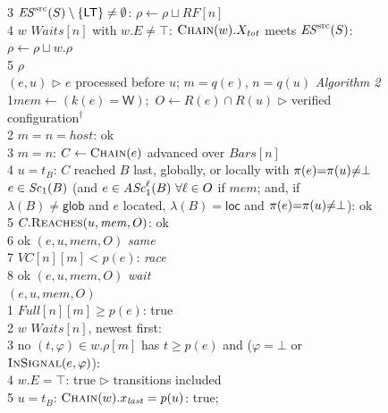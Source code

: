 \begin{figure}[tp]
\begin{minipage}[t]{0.49\textwidth}
\begin{tabbing}
3\> $\mathit{ES}^{\mathrm{src}}(S) \setminus \{\mathsf{LT}\} \ne \emptyset$: $\rho \gets \rho \sqcup \mathit{RF}[n]$ \\
4\> $w$  $\mathit{Waits}[n]$ with $w.E \ne \top$:  $\textsc{Chain}(w).X_{\mathit{tot}}$ meets $\mathit{ES}^{\mathrm{src}}(S)$: $\rho \gets \rho \sqcup w.\rho$ \\
5\> $\rho$ \\[3pt]
 $(e, u)$ \quad $\triangleright$ $e$ processed before $u$; $m{=}q(e)$, $n{=}q(u)$ \hfill \emph{Algorithm 2} \\
1\>$\mathit{mem} \gets (k(e) = \mathsf{W})$;\ $O \gets R(e) \cap R(u)$ \hfill $\triangleright$ verified configuration$^\dagger$ \\
2\> $m = n = \mathit{host}$:  ok \\
3\> $m = n$: $C \gets \textsc{Chain}(e)$ advanced over $\mathit{Bars}[n]$ \\
4\>\> $u = t_B$:  $C$ reached $B$ last, globally, or locally with $\pi(e){=}\pi(u){\ne}\bot$ \\
\>\>\>\> $e \in \mathit{Sc}_{1}(B)$ (and $e \in \mathit{ASc}_{1}^{\ell}(B)\ \forall \ell \in O$ if $\mathit{mem}$; and, if \\
\>\>\>\>$\lambda(B) {\ne} \mathsf{glob}$ and $e$ located, $\lambda(B){=}\mathsf{loc}$ and $\pi(e){=}\pi(u){\ne}\bot$):  ok \\
5\>\> $C.\textsc{Reaches}(u, \mathit{mem}, O)$:  ok \\
6\>\> ok  $(e,u,\mathit{mem},O)$  \emph{same} \\
7\> $\mathit{VC}[n][m] < p(e)$:  \emph{race} \\
8\> ok  $(e,u,\mathit{mem},O)$  \emph{wait} \\[3pt]
 $(e,u,\mathit{mem},O)$ \\
1\> $\mathit{Full}[n][m] \ge p(e)$:  true \\
2\> $w$  $\mathit{Waits}[n]$, newest first: \\
3\>\> no $(t, \varphi) \in w.\rho[m]$ has $t \ge p(e)$ and ($\varphi = \bot$ or $\textsc{InSignal}(e, \varphi)$):  \\
4\>\> $w.E = \top$:  true \hfill $\triangleright$ transitions included \\
5\>\> $u = t_B$:  $\textsc{Chain}(w).x_{\mathit{last}} = p(u)$:  true;  \\

\end{tabbing}
\end{minipage}
\end{figure}
